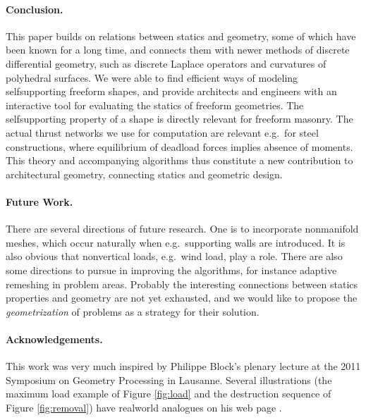 \documentclass[review]{acmsiggraph}
\begin{document}
\paragraph{Conclusion.}

This paper builds on relations between statics and geometry, some of which 
have been known for a long time, and connects them with newer methods of 
discrete differential geometry, such as discrete Laplace operators and 
curvatures of polyhedral surfaces. We were able to find efficient ways of 
modeling self\dash supporting freeform shapes, and provide architects and 
engineers with an interactive tool for evaluating the 
statics of freeform geometries. The self\dash supporting property of a 
shape is directly relevant for freeform masonry. The actual thrust 
networks we use for computation are relevant e.g.\ for steel 
constructions, where equilibrium of deadload forces implies absence of 
moments. This theory and accompanying algorithms thus constitute a new 
contribution to architectural geometry, connecting statics and geometric 
design.

\paragraph{Future Work.}

There are several directions of future research. One is to incorporate 
non\dash manifold meshes, which occur naturally when e.g.\ supporting 
walls are introduced. It is also obvious that non\dash vertical loads, 
e.g.\ wind load, play a role. There are also some directions to pursue in 
improving the algorithms, for instance adaptive remeshing in problem 
areas. Probably the interesting connections between statics properties and 
geometry are not yet exhausted, and we would like to propose the {\em 
geometrization} of problems as a strategy for their solution.

\paragraph*{Acknowledgements.}

This work was very much inspired by Philippe Block's plenary lecture
at the 2011 Symposium on Geometry Processing in Lausanne. Several 
illustrations (the maximum load example of Figure
\ref{fig:load} and the destruction sequence of Figure \ref{fig:removal})
have real\dash world analogues on his web page \cite{catalan}.

	
	
\end{document}
